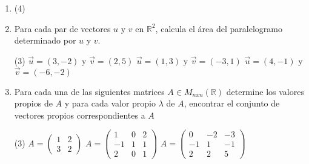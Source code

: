\documentclass[letterpaper,11pt]{article}
\begin{document}
\begin{enumerate}





\item 
\begin{tasks}(4)
\task 
\task
\task  
\task 
\end{tasks}
\item Para cada par de vectores $u$ y $v$ en $\mathbb{R}^2$, calcula el área del paralelogramo determinado por $u$ y $v$.

\begin{tasks}(3)
\task $\vec{u} = (3,-2)$ y $\vec{v} = (2,5)$
\task $\vec{u}  = (1,3)$ y $\vec{v}  = (-3,1)$ 
\task $\vec{u}  = (4,-1)$ y $\vec{v}  = (-6,-2)$
\end{tasks}
\item Para cada una de las siguientes matrices $A \in M_{nxn}(\mathbb{R})$ determine los valores propios de $A$ y para cada valor propio $\lambda$ de $A$, encontrar el conjunto de vectores propios correspondientes a $A$

\begin{tasks}(3)
\task $A = \begin{pmatrix} 1 & 2 \\ 3 & 2 \end{pmatrix}$
\task $A = \begin{pmatrix} 1 & 0 & 2 \\ -1 & 1 & 1 \\ 2 & 0 & 1 \end{pmatrix}$
\task $A = \begin{pmatrix} 0 & -2 & -3 \\ -1 & 1 & -1 \\ 2 & 2 & 5 \end{pmatrix}$
\end{tasks}


\end{enumerate}
\end{document}
